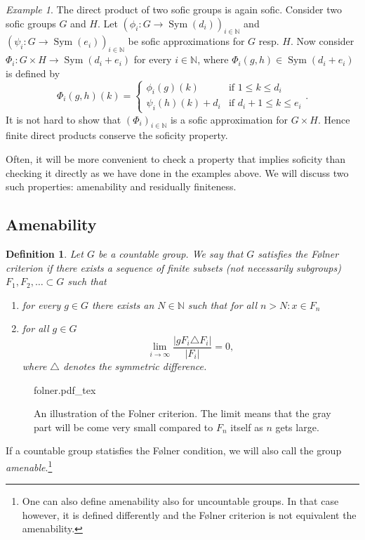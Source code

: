 \documentclass[titlepage, a4paper]{article}
\newcommand{\N}{\mathbb{N}}
\newcommand{\card}[1]{\left| #1 \right|}
\DeclareMathOperator{\sym}{Sym}
\newtheorem{definition}{Definition}
\theoremstyle{remark}
\newtheorem{example}{Example}
\newcommand{\incfig}[1]{%
    \def\svgwidth{.5\columnwidth}
    {#1.pdf_tex}
}
\begin{document}
    \begin{example}\label{ex:direct_product_sofic}
        The direct product of two sofic groups is again sofic. Consider two sofic groups $G$ and $H$. Let $(\phi_i: G \to \sym(d_i))_{i \in \N}$ and $(\psi_i: G \to \sym(e_i))_{i \in \N}$ be sofic approximations for $G$ resp. $H$. Now consider $\Phi_i : G \times H \to \sym(d_i+e_i)$ for every $i \in \N$, where $\Phi_i(g, h) \in \sym(d_i+e_i)$ is defined by
        \[
            \Phi_i(g,h)(k) = \begin{cases} \phi_i(g)(k) & \text{if } 1 \leq k \leq d_i \\
            \psi_i(h)(k)+d_i & \text{if } d_i + 1 \leq k \leq e_i
            \end{cases}.
        \]
        It is not hard to show that $(\Phi_i)_{i \in \N}$ is a sofic approximation for $G \times H$. %
        Hence finite direct products conserve the soficity property.
    \end{example}


    Often, it will be more convenient to check a property that implies soficity than checking it directly as we have done in the examples above. We will discuss two such properties: amenability and residually finiteness.

    \subsection{Amenability}



    \begin{definition}\cite{noauthor_folner_2019} \label{def:folner}
        Let $G$ be a countable group. We say that $G$ satisfies the Følner criterion if there exists a sequence of finite subsets (not necessarily subgroups) $F_1, F_2, \dots \subset G$ such that 
        \begin{enumerate}
            \item for every $g \in G$ there exists an $N \in \N$ such that for all $n > N: x \in F_n$
            \item for all $g \in G$ 
            \[\lim_{i\to \infty} \frac{\card{gF_i \triangle F_i}}{\card{F_i}} = 0, \]
            where $\triangle$ denotes the symmetric difference.
        \end{enumerate}
    \end{definition}
\begin{figure}[ht]
    \centering
    \incfig{folner}
    \caption{An illustration of the Folner criterion. The limit means that the gray part will be come very small compared to  $F_n$ itself as $n$ gets large.}
    \label{fig:riemmans-theorem}
\end{figure}
If a countable group statisfies the Følner condition, we will also call the group \emph{amenable}.\footnote{One can also define amenability also for uncountable groups. In that case however, it is defined differently and the Følner criterion is not equivalent the amenability.}
\end{document}

